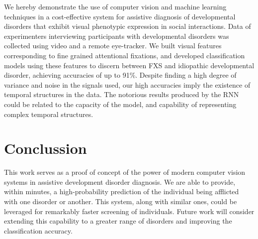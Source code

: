 \documentclass{llncs}
\begin{document}
We hereby demonstrate the use of computer vision and machine learning techniques in a cost-effective system for assistive diagnosis of developmental disorders that exhibit visual phenotypic expression in social interactions. Data of experimenters interviewing participants with developmental disorders was collected using video and a remote eye-tracker. We built visual features corresponding to fine grained attentional fixations, and developed classification models using these features to discern between FXS and idiopathic developmental disorder, achieving accuracies of up to 91\%. Despite finding a high degree of variance and noise in the signals used, our high accuracies imply the existence of temporal structures in the data. The notorious results produced by the RNN could be related to the capacity of the model, and capability of representing complex temporal structures.   




\vspace{- 1.5em}
\section{Conclussion}
\vspace{- 1.5em}

This work serves as a proof of concept of the power of modern computer vision systems in assistive development disorder diagnosis. We are able to provide, within minutes, a high-probability prediction of the individual being afflicted with one disorder or another. This system, along with similar ones, could be leveraged for remarkably faster screening of individuals. Future work will consider extending this capability to a greater range of disorders and improving the classification accuracy.

{\footnotesize


}
\end{document}
